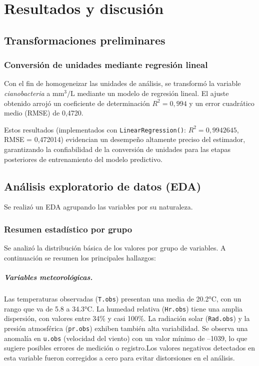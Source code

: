 \documentclass[
  11pt,
  pdftitle=TFI - Tschopp Joaquín S.,
  pdfauthor=Tschopp Joaquín S.,
  pdfcreator=LaTeX with hyperref,
]{report}  %
\begin{document}
\chapter{Resultados y discusión}

\section{Transformaciones preliminares}

\subsection{Conversión de unidades mediante regresión lineal}

Con el fin de homogeneizar las unidades de análisis, se transformó la variable \textit{cianobacteria} a \(\text{mm}^3/\text{L}\) mediante un modelo de regresión lineal.  
El ajuste obtenido arrojó un coeficiente de determinación \(R^2 = 0{,}994\) y un error cuadrático medio (RMSE) de 0,4720.  

Estos resultados (implementados con \texttt{LinearRegression()}: \(R^2 = 0{,}9942645\), RMSE = 0,472014) evidencian un desempeño altamente preciso del estimador, garantizando la confiabilidad de la conversión de unidades para las etapas posteriores de entrenamiento del modelo predictivo.


\section{Análisis exploratorio de datos (EDA)}

Se realizó un EDA agrupando las variables por su naturaleza.

\subsection{Resumen estadístico por grupo}

Se analizó la distribución básica de los valores por grupo de variables. A continuación se resumen los principales hallazgos:

\paragraph{Variables meteorológicas.}
Las temperaturas observadas (\texttt{T.obs}) presentan una media de 20.2°C, con un rango que va de 5.8 a 34.3°C. La humedad relativa (\texttt{Hr.obs}) tiene una amplia dispersión, con valores entre 34\% y casi 100\%. La radiación solar (\texttt{Rad.obs}) y la presión atmosférica (\texttt{pr.obs}) exhiben también alta variabilidad. Se observa una anomalía en \texttt{u.obs} (velocidad del viento) con un valor mínimo de –1039, lo que sugiere posibles errores de medición o registro.Los valores negativos detectados en esta variable fueron corregidos a cero para evitar distorsiones en el análisis.
\end{document}

